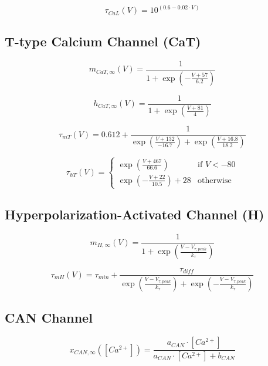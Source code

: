 \documentclass{article}
\begin{document}
\begin{equation}
\tau_{CaL}(V) = 10^{(0.6 - 0.02 \cdot V)}
\end{equation}

\subsection*{T-type Calcium Channel (CaT)}
\begin{equation}
m_{CaT,\infty}(V) = \frac{1}{1 + \exp\left(-\frac{V + 57}{6.2}\right)}
\end{equation}

\begin{equation}
h_{CaT,\infty}(V) = \frac{1}{1 + \exp\left(\frac{V + 81}{4}\right)}
\end{equation}

\begin{equation}
\tau_{mT}(V) = 0.612 + \frac{1}{\exp\left(\frac{V + 132}{-16.7}\right) + \exp\left(\frac{V + 16.8}{18.2}\right)}
\end{equation}

\begin{equation}
\tau_{hT}(V) = 
\begin{cases} 
\exp\left(\frac{V + 467}{66.6}\right) & \text{if } V < -80 \\
\exp\left(-\frac{V + 22}{10.5}\right) + 28 & \text{otherwise}
\end{cases}
\end{equation}

\subsection*{Hyperpolarization-Activated Channel (H)}
\begin{equation}
m_{H,\infty}(V) = \frac{1}{1 + \exp\left(\frac{V - V_{\tau,peak}}{k_{\tau}}\right)}
\end{equation}

\begin{equation}
\tau_{mH}(V) = \tau_{min} + \frac{\tau_{diff}}{\exp\left(\frac{V - V_{\tau,peak}}{k_{\tau}}\right) + \exp\left(-\frac{V - V_{\tau,peak}}{k_{\tau}}\right)}
\end{equation}

\subsection*{CAN Channel}
\begin{equation}
x_{CAN,\infty}([Ca^{2+}]) = \frac{a_{CAN} \cdot [Ca^{2+}]}{a_{CAN} \cdot [Ca^{2+}] + b_{CAN}}
\end{equation}
\end{document}
